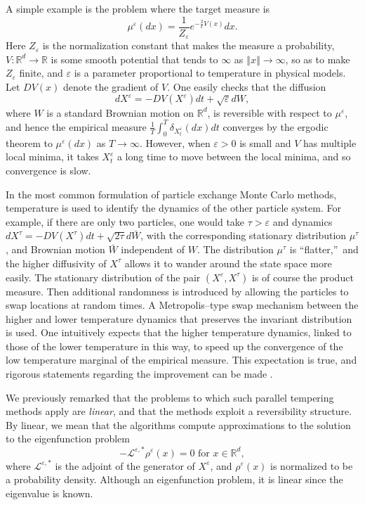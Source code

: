 \documentclass[english,11pt]{article}%
\newcommand{\R}{\mathbb{R}}
\numberwithin{equation}{section}
\numberwithin{example}{section}
\numberwithin{theorem}{section}
\begin{document}
A simple example is the problem where the target measure is
\[
\mu^{\varepsilon}(dx)=\frac{1}{Z_{\varepsilon}}e^{-\frac{2}{\varepsilon}%
V(x)}dx.
\]
Here $Z_{\varepsilon}$ is the normalization constant that makes the measure a
probability, $V:\mathbb{R}^{d}\rightarrow\mathbb{R}$ is some smooth potential
that tends to $\infty$ as $\left\Vert x\right\Vert \rightarrow\infty$, so as to
make $Z_{\varepsilon}$ finite, and $\varepsilon$ is a parameter proportional
to temperature in physical models. Let $DV(x)$ denote the gradient of $V$. One
easily checks that the diffusion
\begin{equation}
dX^{\varepsilon}=-DV(X^{\varepsilon})dt+\sqrt{\varepsilon}dW,\label{eqn:SDE}%
\end{equation}
where $W$ is a standard Brownian motion on $\R^d$, 
is reversible with respect to $\mu^{\varepsilon}$, and hence the empirical
measure $\frac{1}{T}\int_{0}^{T}\delta_{X_{t}^{\varepsilon}}(dx)dt$ converges
by the ergodic theorem to $\mu^{\varepsilon}(dx)$ as $T\rightarrow\infty$.
However, when $\varepsilon>0$ is small and $V$ has multiple local minima, it
takes $X_{t}^{\varepsilon}$ a long time to move between the local minima, and
so convergence is slow.

In the most common formulation of particle exchange Monte Carlo methods, temperature is used to identify the
dynamics of the other particle system. For example, if there are only two particles, one would
take $\tau>\varepsilon$ and dynamics $dX^{\tau}=-DV(X^{\tau})dt+\sqrt{2\tau
}d\bar{W}$, with the corresponding stationary distribution $\mu^{\tau}$, and
Brownian motion $\bar{W}$ independent of $W$. The distribution $\mu^{\tau}$ is
\textquotedblleft flatter,\textquotedblright\ and the higher diffusivity of
$X^{\tau}$ allows it to wander around the state space more easily. The
stationary distribution of the pair $(X^{\varepsilon},X^{\tau})$ is of course
the product measure. Then additional randomness is introduced by allowing the
particles to swap locations at random times. 
A Metropolis--type swap mechanism between the higher and lower temperature dynamics that preserves the invariant distribution is used. One intuitively expects that the higher temperature dynamics, linked to those of the lower temperature in this way, to speed up the convergence of the low temperature marginal of the empirical measure. This expectation is true, and rigorous statements regarding the
improvement can be made \cite{dupliupladol,dupwu2}.



We previously remarked that the problems to which such parallel tempering methods apply are \emph{linear}, and that the methods exploit a reversibility structure. By linear, we mean that the algorithms compute approximations to the solution to the eigenfunction problem
\begin{equation}
-\mathcal{L}^{\varepsilon,\ast}\rho^{\varepsilon}(x)=0\text{ for }%
x\in\mathbb{R}^{d}, \label{eqn:SD}%
\end{equation}
where $\mathcal{L}^{\varepsilon,\ast}$ is the adjoint of the generator of
$X^{\varepsilon}$, and $\rho^{\varepsilon}(x)$ is normalized to be a
probability density. Although an eigenfunction problem, it is linear since the
eigenvalue is known.
\end{document}
